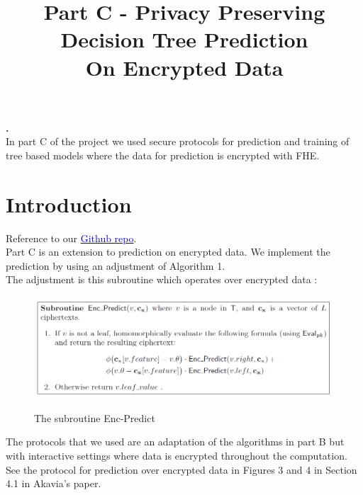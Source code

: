 \documentclass[11pt]{article}
\renewenvironment{abstract}
 {\par\noindent\textbf{\abstractname.}\ \ignorespaces}
 {\par\medskip}
\begin{document}
\title{Part C - Privacy Preserving Decision Tree Prediction \\ On Encrypted Data}



\maketitle
\tableofcontents

\newpage

\begin{abstract}
\\ In part C of the project we used secure protocols for prediction and training of tree based models where the data for prediction is encrypted with FHE.
\end{abstract}

\section{Introduction}
Reference to our \href{https://github.com/assiakhateeb/PPML_lab/tree/main/part\%20C}{\textcolor{blue}{Github repo}}.
\\
Part C is an extension to prediction on encrypted data. We implement the prediction by using an adjustment of Algorithm 1.\\
The adjustment is this subroutine which operates over encrypted data :\\

\begin{figure}[H]
\centering
\includegraphics[width=4.7in]{algo1new.PNG}
\caption{}
\label{fig:label}{The subroutine Enc-Predict}
\end{figure}

The protocols that we used are an adaptation of the algorithms in part B but with interactive settings where data is encrypted throughout the computation.\\
See the protocol for prediction over encrypted data in Figures 3 and 4 in Section 4.1 in Akavia's paper.
\end{document}
